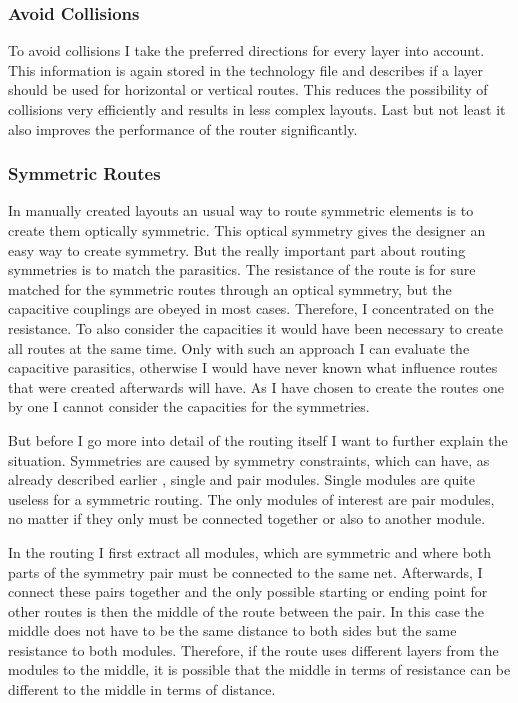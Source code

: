 \subsubsection{Avoid Collisions}
To avoid collisions I take the preferred directions for every layer into account. This information is again stored in the technology file and describes if a layer should be used for horizontal or vertical routes. This reduces the possibility of collisions very efficiently and results in less complex layouts. Last but not least it also improves the performance of the router significantly.

\subsubsection{Symmetric Routes}
In manually created layouts an usual way to route symmetric elements is to create them optically symmetric. This optical symmetry gives the designer an easy way to create symmetry. But the really important part about routing symmetries is to match the parasitics. The resistance of the route is for sure matched for the symmetric routes through an optical symmetry, but the capacitive couplings are obeyed in most cases. Therefore, I concentrated on the resistance. To also consider the capacities it would have been necessary to create all routes at the same time. Only with such an approach I can evaluate the capacitive parasitics, otherwise I would have never known what influence routes that were created afterwards will have. As I have chosen to create the routes one by one I cannot consider the capacities for the symmetries.

But before I go more into detail of the routing itself I want to further explain the situation. Symmetries are caused by symmetry constraints, which can have, as already described earlier , single and pair modules. Single modules are quite useless for a symmetric routing. The only modules of interest are pair modules, no matter if they only must be connected together or also to another module.

In the routing I first extract all modules, which are symmetric and where both parts of the symmetry pair must be connected to the same net. Afterwards, I connect these pairs together and the only possible starting or ending point for other routes is then the middle of the route between the pair. In this case the middle does not have to be the same distance to both sides but the same resistance to both modules. Therefore, if the route uses different layers from the modules to the middle, it is possible that the middle in terms of resistance can be different to the middle in terms of distance.

